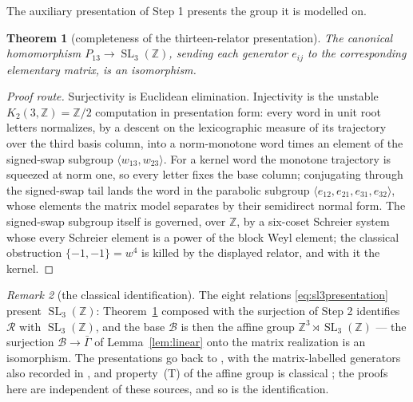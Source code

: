 \documentclass[11pt]{amsart}
\newcommand{\leanverified}[2]{\ignorespaces}
\newtheorem{theorem}{Theorem}[section]
\theoremstyle{definition}
\theoremstyle{remark}
\newtheorem{remark}[theorem]{Remark}
\theoremstyle{plain}
\newcommand{\SL}{\operatorname{SL}}
\begin{document}
The auxiliary presentation of Step 1 presents the group it is modelled
on.

\begin{theorem}[completeness of the thirteen-relator presentation]
\label{thm:p13-complete}
The canonical homomorphism $P_{13}\to\SL_3(\mathbb Z)$, sending each
generator $e_{ij}$ to the corresponding elementary matrix, is an
isomorphism.
\leanverified{Monsters/P13DescentMaster}{GroupApproximation.P13DescentMaster.p13CompletenessEquiv}
\end{theorem}

\begin{proof}[Proof route]
Surjectivity is Euclidean elimination.  Injectivity is the unstable
$K_2(3,\mathbb Z)=\mathbb Z/2$ computation in presentation form: every
word in unit root letters normalizes, by a descent on the
lexicographic measure of its trajectory over the third basis column,
into a norm-monotone word times an element of the signed-swap
subgroup $\langle w_{13},w_{23}\rangle$.  For a kernel word the
monotone trajectory is squeezed at norm one, so every letter fixes
the base column; conjugating through the signed-swap tail lands the
word in the parabolic subgroup
$\langle e_{12},e_{21},e_{31},e_{32}\rangle$, whose elements the
matrix model separates by their semidirect normal form.  The
signed-swap subgroup itself is governed, over $\mathbb Z$, by a
six-coset Schreier system whose every Schreier element is a power of
the block Weyl element; the classical obstruction $\{-1,-1\}=w^{4}$
is killed by the displayed relator, and with it the kernel.
\end{proof}

\begin{remark}[the classical identification]\label{rem:classical-base}
The eight relations \eqref{eq:sl3presentation} present
$\SL_3(\mathbb Z)$: Theorem~\ref{thm:p13-complete} composed with the
surjection of Step 2 identifies $\mathcal R$ with $\SL_3(\mathbb Z)$,
and the base $\mathcal B$ is then the affine group
$\mathbb Z^3\rtimes\SL_3(\mathbb Z)$ --- the surjection
$\mathcal B\to\bar\Gamma$ of Lemma~\ref{lem:linear} onto the matrix
realization is an isomorphism.
\leanverified{Monsters/LiteralBaseCompleteness}{GroupApproximation.LiteralBaseCompleteness.baseAffineEquiv}
The presentations go back to \cite[Theorem~2]{CRW}, with the
matrix-labelled generators also recorded in \cite{CLV}, and
property~\textup{(T)} of the affine group is classical
\cite[Example~1.7.4(i)]{BHV}; the proofs here are independent of
these sources, and so is the identification.
\end{remark}
\end{document}
